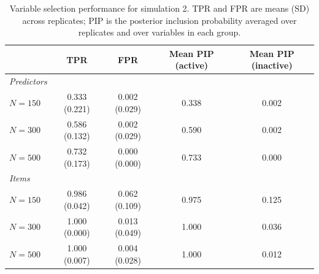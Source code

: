 \begin{table}[H]
\centering
\begin{tabular}{lcccc}
  \toprule
 & TPR & FPR & Mean PIP (active) & Mean PIP (inactive) \\ 
  \midrule
\textit{Predictors} &  &  &  &  \\ 
  $N = 150$ & 0.333 (0.221) & 0.002 (0.029) & 0.338 & 0.002 \\ 
  $N = 300$ & 0.586 (0.132) & 0.002 (0.029) & 0.590 & 0.002 \\ 
  $N = 500$ & 0.732 (0.173) & 0.000 (0.000) & 0.733 & 0.000 \\ 
   \midrule
\textit{Items} &  &  &  &  \\ 
  $N = 150$ & 0.986 (0.042) & 0.062 (0.109) & 0.975 & 0.125 \\ 
  $N = 300$ & 1.000 (0.000) & 0.013 (0.049) & 1.000 & 0.036 \\ 
  $N = 500$ & 1.000 (0.007) & 0.004 (0.028) & 1.000 & 0.012 \\ 
   \bottomrule
\end{tabular}
\caption{Variable selection performance for simulation 2. TPR and FPR are means (SD) across replicates; PIP is the posterior inclusion probability averaged over replicates and over variables in each group.} 
\label{table:sim2_var_sel_summary}
\end{table}
